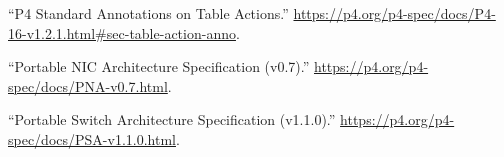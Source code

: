 \documentclass[11pt]{article}
\begin{document}
{{\begin{thebibliography}{45}
\mdbibitemlabel{{}[22]}\textquotedblleft{}P4 Standard Annotations on Table Actions.\textquotedblright{} \href{https://p4.org/p4-spec/docs/P4-16-v1.2.1.html\%23sec-table-action-anno}{{\ttfamily https://\hspace{0pt}p4.\hspace{0pt}org/\hspace{0pt}p4-\hspace{0pt}spec/\hspace{0pt}docs/\hspace{0pt}P4-\hspace{0pt}16-\hspace{0pt}v1.\hspace{0pt}2.\hspace{0pt}1.\hspace{0pt}html\#\hspace{0pt}sec-\hspace{0pt}table-\hspace{0pt}action-\hspace{0pt}anno}}.\label{p4actionannotations}%

\mdbibitemlabel{{}[23]}\textquotedblleft{}Portable NIC Architecture Specification (v0.7).\textquotedblright{} \href{https://p4.org/p4-spec/docs/PNA-v0.7.html}{{\ttfamily https://\hspace{0pt}p4.\hspace{0pt}org/\hspace{0pt}p4-\hspace{0pt}spec/\hspace{0pt}docs/\hspace{0pt}PNA-\hspace{0pt}v0.\hspace{0pt}7.\hspace{0pt}html}}.\label{pna}%

\mdbibitemlabel{{}[24]}\textquotedblleft{}Portable Switch Architecture Specification (v1.1.0).\textquotedblright{} \href{https://p4.org/p4-spec/docs/PSA-v1.1.0.html}{{\ttfamily https://\hspace{0pt}p4.\hspace{0pt}org/\hspace{0pt}p4-\hspace{0pt}spec/\hspace{0pt}docs/\hspace{0pt}PSA-\hspace{0pt}v1.\hspace{0pt}1.\hspace{0pt}0.\hspace{0pt}html}}.\label{psa}%


\end{thebibliography}}}
\end{document}

